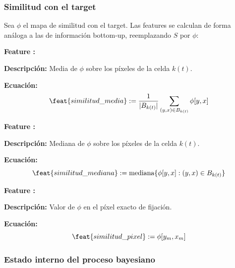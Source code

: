 \subsubsection{Similitud con el target}

Sea $\phi$ el mapa de similitud con el target. Las features se
calculan de forma análoga a las de información bottom-up,
reemplazando $S$ por $\phi$:

\begin{featuredef}
\textbf{Feature \thetcbcounter:} 

\textbf{Descripción:} Media de $\phi$ sobre los píxeles de la celda $k(t)$.

\textbf{Ecuación:}
\begin{equation}
    \feat{similitud\_media} := \frac{1}{|B_{k(t)}|}
    \sum_{(y,x) \in B_{k(t)}} \phi[y, x]
\end{equation}
\end{featuredef}

\begin{featuredef}
\textbf{Feature \thetcbcounter:} 

\textbf{Descripción:} Mediana de $\phi$ sobre los píxeles de la celda $k(t)$.

\textbf{Ecuación:}
\begin{equation}
    \feat{similitud\_mediana} := \text{mediana}\{\phi[y, x] : (y, x) \in B_{k(t)}\}
\end{equation}
\end{featuredef}

\begin{featuredef}
\textbf{Feature \thetcbcounter:} 

\textbf{Descripción:} Valor de $\phi$ en el píxel exacto de fijación.

\textbf{Ecuación:}
\begin{equation}
    \feat{similitud\_pixel} := \phi[y_m, x_m]
\end{equation}
\end{featuredef}

\subsubsection{Estado interno del proceso bayesiano}

